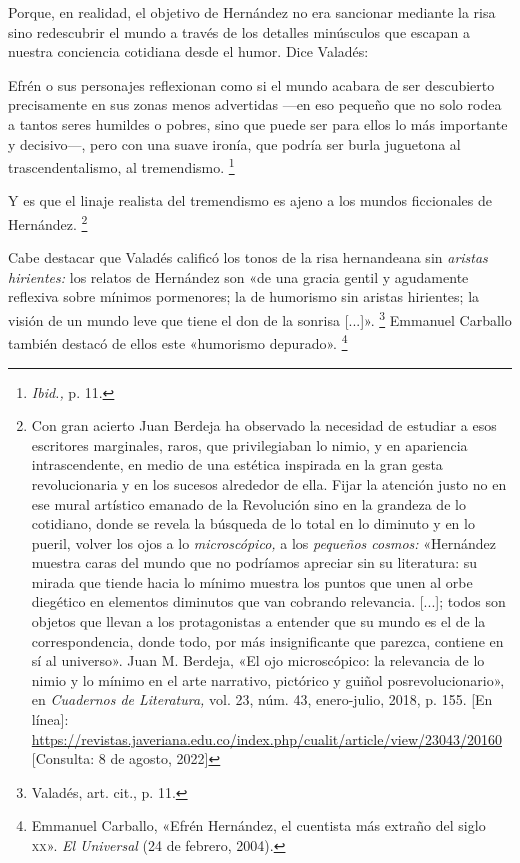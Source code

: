 \documentclass[14pt,twoside,final]{extbook} %
\let\oldfootnote\footnote
\renewcommand\footnote[1]{%
\oldfootnote{\hspace{1mm}#1}}
\begin{document}
Porque, en realidad, el objetivo de Hernández no era sancionar mediante la risa sino redescubrir el mundo a través de los detalles minúsculos que escapan a nuestra conciencia cotidiana desde el humor. Dice Valadés: 
\begin{quoting}
Efrén o sus personajes reflexionan como si el mundo acabara de ser descubierto precisamente en sus zonas menos advertidas ---en eso pequeño que no solo rodea a tantos seres humildes o pobres, sino que puede ser para ellos lo más importante y decisivo---, pero con una suave ironía, que podría ser burla juguetona al trascendentalismo, al tremendismo.\footnote{\emph{Ibid.,} p. 11.}
\end{quoting}
Y es que el linaje realista del tremendismo es ajeno a los mundos ficcionales de Hernández.\footnote{Con gran acierto Juan Berdeja ha observado la necesidad de estudiar a esos escritores marginales, raros, que privilegiaban lo nimio, y en apariencia intrascendente, en medio de una estética inspirada en la gran gesta revolucionaria y en los sucesos alrededor de ella. Fijar la atención justo no en ese mural artístico emanado de la Revolución sino en la grandeza de lo cotidiano, donde se revela la búsqueda de lo total en lo diminuto y en lo pueril, volver los ojos a lo \emph{microscópico,} a los \emph{pequeños cosmos:} «Hernández muestra caras del mundo que no podríamos apreciar sin su literatura: su mirada que tiende hacia lo mínimo muestra los puntos que unen al orbe diegético en elementos diminutos que van cobrando relevancia. [...]; todos son objetos que llevan a los protagonistas a entender que su mundo es el de la correspondencia, donde todo, por más insignificante que parezca, contiene en sí al universo». Juan M. Berdeja, «El ojo microscópico: la relevancia de lo nimio y lo mínimo en el arte narrativo, pictórico y guiñol posrevolucionario», en \emph{Cuadernos de Literatura,} vol. 23, núm. 43, enero-julio, 2018, p. 155. [En línea]: \url{https://revistas.javeriana.edu.co/index.php/cualit/article/view/23043/20160} [Consulta: 8 de agosto, 2022]}

Cabe destacar que Valadés calificó los tonos de la risa hernandeana sin \emph{aristas hirientes:} los relatos de Hernández son «de una gracia gentil y agudamente reflexiva sobre mínimos pormenores; la de humorismo sin aristas hirientes; la visión de un mundo leve que tiene el don de la sonrisa [...]».\footnote{Valadés, art. cit., p. 11.} Emmanuel Carballo también destacó de ellos este «humorismo depurado».\footnote{Emmanuel Carballo, «Efrén Hernández, el cuentista más extraño del siglo \textsc{xx}». \emph{El Universal} (24 de febrero, 2004).}
\end{document}
